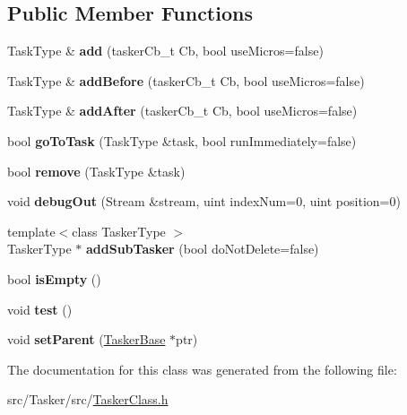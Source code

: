 \subsection*{Public Member Functions}
\begin{DoxyCompactItemize}
\item 
\mbox{\label{class_tasker_ab1b011929f82e45e6de96be3ad816680}} 
Task\+Type \& {\bfseries add} (tasker\+Cb\+\_\+t Cb, bool use\+Micros=false)
\item 
\mbox{\label{class_tasker_a8823e80ee99db02faf92e800c1a0189c}} 
Task\+Type \& {\bfseries add\+Before} (tasker\+Cb\+\_\+t Cb, bool use\+Micros=false)
\item 
\mbox{\label{class_tasker_a82d870310017354b4a7185fedcd74a08}} 
Task\+Type \& {\bfseries add\+After} (tasker\+Cb\+\_\+t Cb, bool use\+Micros=false)
\item 
\mbox{\label{class_tasker_a2b1027cad18c0b510c252c78e07cd23e}} 
bool {\bfseries go\+To\+Task} (Task\+Type \&task, bool run\+Immediately=false)
\item 
\mbox{\label{class_tasker_ac04ba2b621aaf631fa0bcffb429dbcda}} 
bool {\bfseries remove} (Task\+Type \&task)
\item 
\mbox{\label{class_tasker_af9f0f1b6152e21adb2075d29890365d3}} 
void {\bfseries debug\+Out} (Stream \&stream, uint index\+Num=0, uint position=0)
\item 
\mbox{\label{class_tasker_a9bc456b890c556f028f27d0ce85507e8}} 
{\footnotesize template$<$class Tasker\+Type $>$ }\\Tasker\+Type $\ast$ {\bfseries add\+Sub\+Tasker} (bool do\+Not\+Delete=false)
\item 
\mbox{\label{class_tasker_ac243549b2515839aae51a1b818611e14}} 
bool {\bfseries is\+Empty} ()
\item 
\mbox{\label{class_tasker_a55d556448981dd30f79056c6a5eebc9a}} 
void {\bfseries test} ()
\item 
\mbox{\label{class_tasker_ae2b2459b894cd113d57a417963fe1ec9}} 
void {\bfseries set\+Parent} (\hyperlink{class_tasker_base}{Tasker\+Base} $\ast$ptr)
\end{DoxyCompactItemize}


The documentation for this class was generated from the following file\+:\begin{DoxyCompactItemize}
\item 
src/\+Tasker/src/\hyperlink{_tasker_class_8h}{Tasker\+Class.\+h}\end{DoxyCompactItemize}

